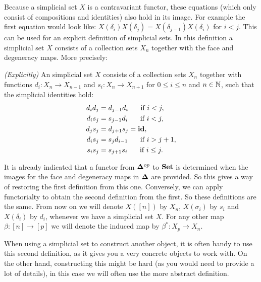 Because a simplicial set $X$ is a contravariant functor, these equations (which only consist of compositions and identities) also hold in its image. For example the first equation would look like: $ X(\delta_i)X(\delta_j) = X(\delta_{j-1})X(\delta_i) $ for $ i < j$. This can be used for an explicit definition of simplicial sets. In this definition a simplicial set $X$ consists of a collection sets $X_n$ together with the face and degeneracy maps. More precisely:

\begin{definition}
	\emph{(Explicitly)} An simplicial set $X$ consists of a collection sets $X_n$ together with functions $d_i : X_n \to X_{n-1}$ and $s_i : X_n \to X_{n+1}$ for $0 \leq i \leq n$ and $n \in \mathbb{N}$, such that the simplicial identities hold:
	\begin{align}
		d_i d_j &= d_{j-1} d_i  \hspace{0.5cm} \text{ if } i < j,\\
		d_i s_j &= s_{j-1} d_i  \hspace{0.5cm} \text{ if } i < j,\\
		d_j s_j &= d_{j+1} s_j = \mathbf{id},\\
		d_i s_j &= s_j d_{i-1}  \hspace{0.5cm} \text{ if } i > j+1,\\
		s_i s_j &= s_{j+1} s_i  \hspace{0.5cm} \text{ if } i \leq j.
	\end{align}
\end{definition}

It is already indicated that a functor from $\mathbf{\Delta}^{op}$ to $\mathbf{Set}$ is determined when the images for the face and degeneracy maps in $\mathbf{\Delta}$ are provided. So this gives a way of restoring the first definition from this one. Conversely, we can apply functorialty to obtain the second definition from the first. So these definitions are the same. From now on we will denote $X([n])$ by $X_n$, $X(\sigma_i)$ by $s_i$ and $X(\delta_i)$ by $d_i$, whenever we have a simplicial set $X$. For any other map $\beta : [n] \to [p]$ we will denote the induced map by $\beta^\ast : X_p \to X_n$.

When using a simplicial set to construct another object, it is often handy to use this second definition, as it gives you a very concrete objects to work with. On the other hand, constructing this might be hard (as you would need to provide a lot of details), in this case we will often use the more abstract definition.

